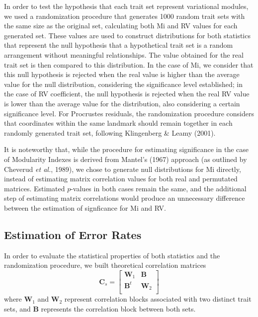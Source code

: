 \documentclass[12pt,]{article}
\begin{document}
In order to test the hypothesis that each trait set represent
variational modules, we used a randomization procedure that generates
1000 random trait sets with the same size as the original set,
calculating both Mi and RV values for each generated set. These values
are used to construct distributions for both statistics that represent
the null hypothesis that a hypothetical trait set is a random
arrangement without meaningful relationships. The value obtained for the
real trait set is then compared to this distribution. In the case of Mi,
we consider that this null hypothesis is rejected when the real value is
higher than the average value for the null distribution, considering the
significance level established; in the case of RV coefficient, the null
hypothesis is rejected when the real RV value is lower than the average
value for the distribution, also considering a certain significance
level. For Procrustes residuals, the randomization procedure considers
that coordinates within the same landmark should remain together in each
randomly generated trait set, following Klingenberg \& Leamy (2001).

It is noteworthy that, while the procedure for estimating significance
in the case of Modularity Indexes is derived from Mantel's (1967)
approach (as outlined by Cheverud \emph{et al.}, 1989), we chose to
generate null distributions for Mi directly, instead of estimating
matrix correlation values for both real and permutated matrices.
Estimated $p$-values in both cases remain the same, and the additional
step of estimating matrix correlations would produce an unnecessary
difference between the estimation of signficance for Mi and RV.

\subsection{Estimation of Error Rates}\label{estimation-of-error-rates}

In order to evaluate the statistical properties of both statistics and
the randomization procedure, we built theoretical correlation matrices
\[
\mathbf{C}_{s} =
\begin{bmatrix}
\mathbf{W}_1 & \mathbf{B} \\
\mathbf{B}^t & \mathbf{W}_2 \\
\end{bmatrix}
\] where $\mathbf{W}_1$ and $\mathbf{W}_2$ represent correlation blocks
associated with two distinct trait sets, and $\mathbf{B}$ represents the
correlation block between both sets.
\end{document}
